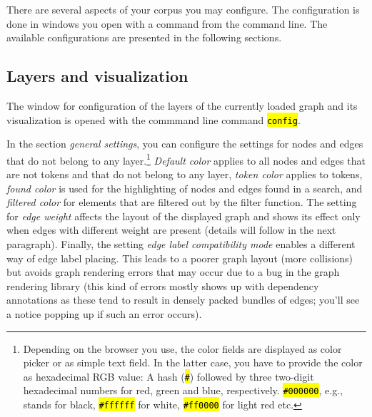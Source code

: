 \documentclass[12pt]{scrartcl}
\newcommand{\code}[1]{\hl{\texttt{#1}}}
\begin{document}
There are several aspects of your corpus you may configure. The configuration is done in windows you open with a command from the command line. The available configurations are presented in the following sections.

\subsection{Layers and visualization}\label{ebenenkonfiguration}

The window for configuration of the layers of the currently loaded graph and its visualization is opened with the commmand line command \code{config}.

In the section \textit{general settings}, you can configure the settings for nodes and edges that do not belong to any layer.\footnote{Depending on the browser you use, the color fields are displayed as color picker or as simple text field. In the latter case, you have to provide the color as hexadecimal RGB value: A hash (\code{\#}) followed by three two-digit hexadecimal numbers for red, green and blue, respectively. \code{\#000000}, e.g., stands for black, \code{\#ffffff} for white, \code{\#ff0000} for light red etc.}
\textit{Default color} applies to all nodes and edges that are not tokens and that do not belong to any layer, \textit{token color} applies to tokens, \textit{found color} is used for the highlighting of nodes and edges found in a search, and \textit{filtered color} for elements that are filtered out by the filter function.
The setting for \textit{edge weight} affects the layout of the displayed graph and shows its effect only when edges with different weight are present (details will follow in the next paragraph).
Finally, the setting \textit{edge label compatibility mode} enables a different way of edge label placing.
This leads to a poorer graph layout (more collisions) but avoids graph rendering errors that may occur due to a bug in the graph rendering library (this kind of errors mostly shows up with dependency annotations as these tend to result in densely packed bundles of edges; you’ll see a notice popping up if such an error occurs).
\end{document}
